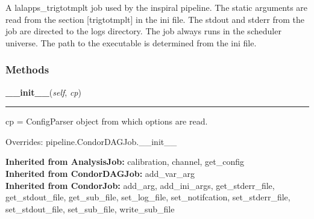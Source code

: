 A lalapps\_trigtotmplt job used by the inspiral pipeline. The static 
arguments are read from the section [trigtotmplt] in the ini file. The 
stdout and stderr from the job are directed to the logs directory. The 
job always runs in the scheduler universe. The path to the executable is 
determined from the ini file.



  \subsubsection{Methods}

    \label{inspiral:TrigToTmpltJob:__init__}
    \vspace{0.5ex}

    \noindent\begin{boxedminipage}{\textwidth}

    \raggedright \textbf{\_\_init\_\_}(\textit{self}, \textit{cp})

    \vspace{-1.5ex}

    \rule{\textwidth}{0.5\fboxrule}
    cp = ConfigParser object from which options are read.

    \vspace{1ex}

      Overrides: pipeline.CondorDAGJob.\_\_init\_\_

    \end{boxedminipage}

  \textbf{Inherited from AnalysisJob:}
    calibration,
    channel,
    get\_config
    \\
  \textbf{Inherited from CondorDAGJob:}
    add\_var\_arg
    \\
  \textbf{Inherited from CondorJob:}
    add\_arg,
    add\_ini\_args,
    get\_stderr\_file,
    get\_stdout\_file,
    get\_sub\_file,
    set\_log\_file,
    set\_notifcation,
    set\_stderr\_file,
    set\_stdout\_file,
    set\_sub\_file,
    write\_sub\_file


